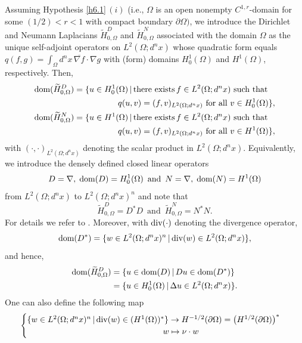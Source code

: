 \documentclass[reqno,10pt, centertags]{amsart}
\newcommand{\no}{\nonumber}
\newcommand{\lb}{\label}
\newcommand{\ol}{\overline}
\newcommand{\wti}{\widetilde}
\newcommand{\Om}{\Omega}
\newcommand{\dom}{\text{\rm{dom}}}
\numberwithin{equation}{section}
\theoremstyle{definition}
\begin{document}
Assuming Hypothesis \ref{h6.1}\,$(i)$ (i.e., $\Om$ is an open
nonempty $C^{1,r}$-domain for some $(1/2)<r<1$ with compact boundary
$\partial\Om)$, we introduce the Dirichlet and Neumann Laplacians
$\wti H_{0,\Om}^D$ and
$\wti H_{0,\Om}^N$ associated with the domain $\Om$ as the unique
self-adjoint operators on $L^2(\Om;d^nx)$ whose quadratic form equals
$q(f,g)=\int_\Om d^nx\,\ol{\nabla f}\cdot \nabla g$ with (form) domains
$H_0^{1}(\Om)$ and $H^{1}(\Om)$, respectively. Then,
\begin{align}
\dom(\wti H_{0,\Om}^D) &= \{u\in H_0^{1}(\Om) \,|\, \text{there exists} \,
f\in L^2(\Om;d^nx) \text{ such that } \no \\
&\hspace*{1.85cm} q(u,v)=(f,v)_{L^2(\Om;d^nx)} \text{ for all } v\in
H_0^{1}(\Om)\},  \\
\dom(\wti H_{0,\Om}^N) &= \{u\in H^{1}(\Om) \,|\, \text{there exists}\,
f\in L^2(\Om;d^nx) \text{ such that } \no \\
&\hspace*{1.85cm} q(u,v)=(f,v)_{L^2(\Om;d^nx)} \text{ for all } v\in
H^{1}(\Om)\},
\end{align}
with $(\cdot,\cdot)_{L^2(\Om;d^nx)}$ denoting the scalar product in
$L^2(\Om;d^nx)$. Equivalently, we introduce the densely defined closed
linear operators
\begin{equation}
D=\nabla, \; \dom(D)=H_0^{1}(\Om) \, \text{ and } \,
N=\nabla, \;  \dom(N)=H^{1}(\Om)
\end{equation}
from $L^2(\Om;d^nx)$ to $L^2(\Om;d^nx)^n$ and note that
\begin{equation}
\wti H_{0,\Om}^D = D^*D \, \text{ and } \, \wti H_{0,\Om}^N = N^*N.
\end{equation}
For details we refer to \cite[Sects.\ XIII.14, XIII.15]{RS78}.
Moreover, with ${\rm div(\cdot)}$ denoting the divergence operator,
\begin{align}
\dom(D^*)=\{w\in L^2(\Omega;d^nx)^n\,|\,{\rm div} (w)\in
L^2(\Omega;d^nx)\},
\end{align}
and hence,
\begin{align}
\dom(\wti H_{0,\Om}^D) &= \{u\in\dom(D) \,|\,Du\in\dom(D^*)\} \no
\\
&= \{u\in H_0^{1}(\Om) \,|\, \Delta u\in L^{2}(\Om;d^nx)\}.
\lb{domHD}
\end{align}
One can also define the following map
\begin{equation}
\begin{cases} \{w\in
L^2(\Omega;d^nx)^n\,|\,{\rm div}(w)\in (H^1(\Omega))^*\} \to
H^{-1/2}(\partial\Omega)
=\big(H^{1/2}(\partial\Omega)\big)^* \\
\hspace*{5.75cm} w\mapsto \nu\cdot w  \end{cases}  \lb{A.11}
\end{equation}
\end{document}
